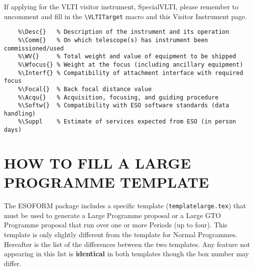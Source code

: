 \documentclass{article}
\begin{document}
If applying for the VLTI visitor instrument, SpecialVLTI, please remember to uncomment
and fill in the \verb|\VLTITarget| macro and this Visitor Instrument page.

\begin{verbatim}
    %\Desc{}   % Description of the instrument and its operation
    %\Comm{}   % On which telescope(s) has instrument been commissioned/used
    %\WV{}     % Total weight and value of equipment to be shipped
    %\Wfocus{} % Weight at the focus (including ancillary equipment)
    %\Interf{} % Compatibility of attachment interface with required focus
    %\Focal{}  % Back focal distance value
    %\Acqu{}   % Acquisition, focusing, and guiding procedure
    %\Softw{}  % Compatibility with ESO software standards (data handling)
    %\Suppl    % Estimate of services expected from ESO (in person days)
\end{verbatim}

\section{HOW TO FILL A LARGE PROGRAMME TEMPLATE}
\label{sec:large}

The ESOFORM package includes a specific template ({\tt templatelarge.tex}) that must be used to generate a Large Programme proposal or a Large GTO Programme proposal that run over one or more Periods (up to four). This template is only slightly different from the
template for Normal Programmes. Hereafter is the list of the
differences between the two templates. Any feature not appearing in
this list is {\bf identical} in both templates though the box number
may differ.
\end{document}
